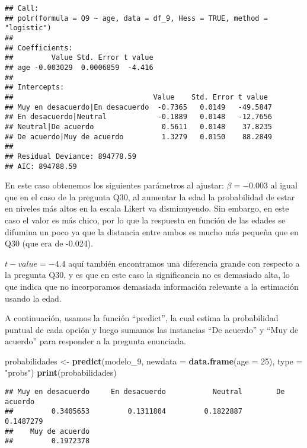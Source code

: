 \documentclass[
]{article}
\newenvironment{Shaded}{\begin{snugshade}}{\end{snugshade}}
\newcommand{\AttributeTok}[1]{\textcolor[rgb]{0.13,0.29,0.53}{#1}}
\newcommand{\DecValTok}[1]{\textcolor[rgb]{0.00,0.00,0.81}{#1}}
\newcommand{\FunctionTok}[1]{\textcolor[rgb]{0.13,0.29,0.53}{\textbf{#1}}}
\newcommand{\NormalTok}[1]{#1}
\newcommand{\OtherTok}[1]{\textcolor[rgb]{0.56,0.35,0.01}{#1}}
\newcommand{\StringTok}[1]{\textcolor[rgb]{0.31,0.60,0.02}{#1}}
\begin{document}
\begin{verbatim}
## Call:
## polr(formula = Q9 ~ age, data = df_9, Hess = TRUE, method = "logistic")
## 
## Coefficients:
##         Value Std. Error t value
## age -0.003029  0.0006859  -4.416
## 
## Intercepts:
##                                 Value    Std. Error t value 
## Muy en desacuerdo|En desacuerdo  -0.7365   0.0149   -49.5847
## En desacuerdo|Neutral            -0.1889   0.0148   -12.7656
## Neutral|De acuerdo                0.5611   0.0148    37.8235
## De acuerdo|Muy de acuerdo         1.3279   0.0150    88.2849
## 
## Residual Deviance: 894778.59 
## AIC: 894788.59
\end{verbatim}

En este caso obtenemos los siguientes parámetros al ajustar:
\(\beta = -0.003\) al igual que en el caso de la pregunta Q30, al
aumentar la edad la probabilidad de estar en niveles más altos en la
escala Likert va disminuyendo. Sin embargo, en este caso el valor es más
chico, por lo que la respuesta en función de las edades se difumina un
poco ya que la distancia entre ambos es mucho más pequeña que en Q30
(que era de -0.024).

\(t-value = -4.4\) aquí también encontramos una diferencia grande con
respecto a la pregunta Q30, y es que en este caso la significancia no es
demasiado alta, lo que indica que no incorporamos demasiada información
relevante a la estimación usando la edad.

A continuación, usamos la función ``predict'', la cual estima la
probabilidad puntual de cada opción y luego sumamos las instancias ``De
acuerdo'' y ``Muy de acuerdo'' para responder a la pregunta enunciada.

\begin{Shaded}
\begin{Highlighting}[]
\NormalTok{probabilidades }\OtherTok{\textless{}{-}} \FunctionTok{predict}\NormalTok{(modelo\_9, }\AttributeTok{newdata =} \FunctionTok{data.frame}\NormalTok{(}\AttributeTok{age =} \DecValTok{25}\NormalTok{), }\AttributeTok{type =} \StringTok{"probs"}\NormalTok{)}
\FunctionTok{print}\NormalTok{(probabilidades)}
\end{Highlighting}
\end{Shaded}

\begin{verbatim}
## Muy en desacuerdo     En desacuerdo           Neutral        De acuerdo 
##         0.3405653         0.1311804         0.1822887         0.1487279 
##    Muy de acuerdo 
##         0.1972378
\end{verbatim}
\end{document}
